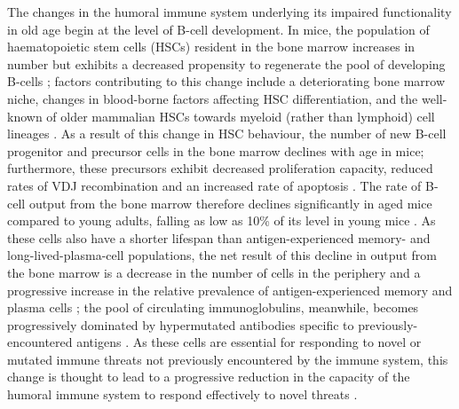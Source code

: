 The changes in the humoral immune system underlying its impaired functionality in old age begin at the level of B-cell development. In mice, the population of haematopoietic stem cells (HSCs) resident in the bone marrow increases in number but exhibits a decreased propensity to regenerate the pool of developing B-cells \parencite{ademokun2010ageing,kogut2012bcells}; factors contributing to this change include a deteriorating bone marrow niche, changes in blood-borne factors affecting HSC differentiation, and the well-known of older mammalian HSCs towards myeloid (rather than lymphoid) cell lineages \parencite{kogut2012bcells,dunnwalters2010bcellageing}. As a result of this change in HSC behaviour, the number of new B-cell progenitor and precursor cells in the bone marrow declines with age in mice; furthermore, these precursors exhibit decreased proliferation capacity, reduced rates of VDJ recombination and an increased rate of apoptosis \parencite{montecino2013immunosenescence,kogut2012bcells,labrie2004bone}. The rate of B-cell output from the bone marrow therefore declines significantly in aged mice compared to young adults, falling as low as 10\% of its level in young mice \parencite{kogut2012bcells}. As these \naive cells also have a shorter lifespan than antigen-experienced memory- and long-lived-plasma-cell populations, the net result of this decline in output from the bone marrow is a decrease in the number of \naive cells in the periphery and a progressive increase in the relative prevalence of antigen-experienced memory and plasma cells \parencite{mehr2011reversing,kogut2012bcells}; the pool of circulating immunoglobulins, meanwhile, becomes progressively dominated by hypermutated antibodies specific to previously-encountered antigens \parencite{kogut2012bcells}. As these \naive cells are essential for responding to novel or mutated immune threats not previously encountered by the immune system, this change is thought to lead to a progressive reduction in the capacity of the humoral immune system to respond effectively to novel threats \parencite{kogut2012bcells}.

